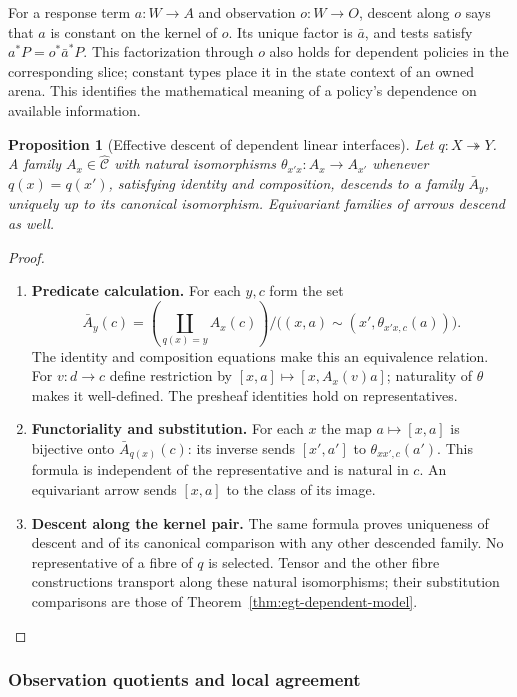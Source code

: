 \documentclass[11pt,a4paper]{article}
\numberwithin{equation}{section}
\newtheorem{proposition}[theorem]{Proposition}
\theoremstyle{definition}
\theoremstyle{remark}
\theoremstyle{plain}
\begin{document}
For a response term $a:W\to A$ and observation $o:W\to O$,
descent along $o$ says that $a$ is constant on the kernel of $o$. Its unique
factor is $\bar a$, and tests satisfy
$a^*P=o^*\bar a^*P$. This factorization through $o$ also holds for dependent
policies in the corresponding slice; constant types place it in the
state context of an owned arena. This identifies the mathematical
meaning of a policy's dependence on available information.

\begin{proposition}[Effective descent of dependent linear interfaces]
\label{prop:egt-linear-descent}
Let $q:X\twoheadrightarrow Y$. A family $A_x\in\widehat{\mathcal C}$
with natural isomorphisms $\theta_{x'x}:A_x\to A_{x'}$ whenever
$q(x)=q(x')$, satisfying identity and composition, descends to a family
$\bar A_y$, uniquely up to its canonical isomorphism. Equivariant
families of arrows descend as well.
\end{proposition}
\begin{proof}
\leavevmode
\begin{enumerate}[label=\textup{(\arabic*)},leftmargin=*,itemsep=4pt,topsep=3pt]
  \item \textbf{Predicate calculation.} For each $y,c$ form the set
\[
 \bar A_y(c)=
 \left(\coprod_{q(x)=y}A_x(c)\right)\big/\bigl(
 (x,a)\sim(x',\theta_{x'x,c}(a))\bigr).
\]
The identity and composition equations make this an equivalence relation. For $v:d\to c$ define restriction by
$[x,a]\mapsto[x,A_x(v)a]$; naturality of $\theta$ makes it
well-defined. The presheaf identities hold on representatives.
  \item \textbf{Functoriality and substitution.} For each
$x$ the map $a\mapsto[x,a]$ is bijective onto $\bar A_{q(x)}(c)$:
its inverse sends $[x',a']$ to $\theta_{xx',c}(a')$. This formula is independent of the representative and is natural in $c$. An equivariant arrow sends $[x,a]$ to the class of its image.
  \item \textbf{Descent along the kernel pair.} The same
formula proves uniqueness of descent and of its canonical comparison
with any other descended family. No representative of a fibre of $q$
is selected. Tensor and the other fibre constructions transport along
these natural isomorphisms; their substitution comparisons are those of
Theorem~\ref{thm:egt-dependent-model}.
\end{enumerate}
\end{proof}

\subsubsection{Observation quotients and local agreement}
\end{document}
